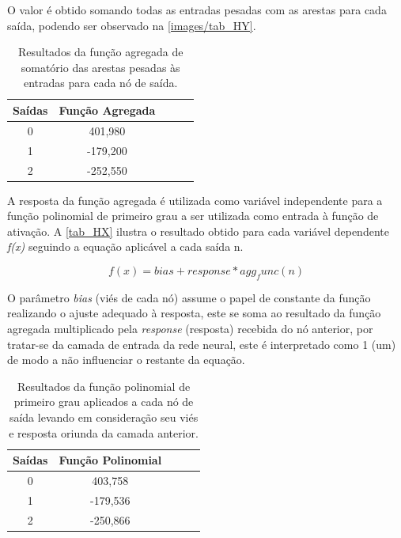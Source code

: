 O valor é obtido somando todas as entradas pesadas com as arestas para cada saída, podendo ser observado na \autoref{images/tab_HY}.

\begin{table}[htb]
	\centering
    \caption{\label{tab_HY}Resultados da função agregada de somatório das arestas pesadas às entradas para cada nó de saída.}
    \begin{tabular}{ccccc}
        \hline
		\textbf{Sa\'{i}das} & \textbf{Fun\c{c}\~{a}o Agregada} \\ \hline
		0 & 401,980    \\ \hline
		1 & -179,200    \\ \hline
		2 & -252,550  \\ \hline
    \end{tabular}
    
\end{table}

A resposta da função agregada é utilizada como variável independente para a função polinomial de primeiro grau a ser utilizada como entrada à função de ativação. A \autoref{tab_HX} ilustra o resultado obtido para cada variável dependente \textit{f(x)}  seguindo a equação aplicável a cada saída n.

\[ f(x) = bias + response * agg_func(n)\]

O parâmetro \textit{bias} (viés de cada nó) assume o papel de constante da função realizando o ajuste adequado à resposta, este se soma ao resultado da função agregada multiplicado pela \textit{response} (resposta) recebida do nó anterior, por tratar-se da camada de entrada da rede neural, este é interpretado como 1 (um) de modo a não influenciar o restante da equação.

\begin{table}[htb]
	\centering
    \caption{\label{tab_HX}Resultados da função polinomial de primeiro grau aplicados a cada nó de saída levando em consideração seu viés e resposta oriunda da camada anterior.}
    \begin{tabular}{ccccc}
        \hline
		\textbf{Sa\'{i}das} & \textbf{Fun\c{c}\~{a}o Polinomial} \\ \hline
		0 & 403,758    \\ \hline
		1 & -179,536    \\ \hline
		2 & -250,866  \\ \hline
    \end{tabular}
    
\end{table}


